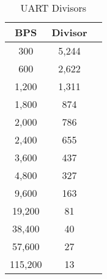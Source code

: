 \begin{table}[ht]
    \begin{center}
        \begin{tabular}{|c|c|c|} \hline
            BPS & Divisor \\ \hline\hline
            300 & 5,244 \\ \hline
            600 & 2,622 \\ \hline
            1,200 & 1,311 \\ \hline
            1,800 & 874 \\ \hline
            2,000 & 786 \\ \hline
            2,400 & 655 \\ \hline
            3,600 & 437 \\ \hline
            4,800 & 327 \\ \hline
            9,600 & 163 \\ \hline
            19,200 & 81 \\ \hline
            38,400 & 40 \\ \hline
            57,600 & 27 \\ \hline
            115,200 & 13 \\ \hline
        \end{tabular}
    \end{center}
    \caption{UART Divisors}
    \label{tab:uart_divisors}
\end{table}

